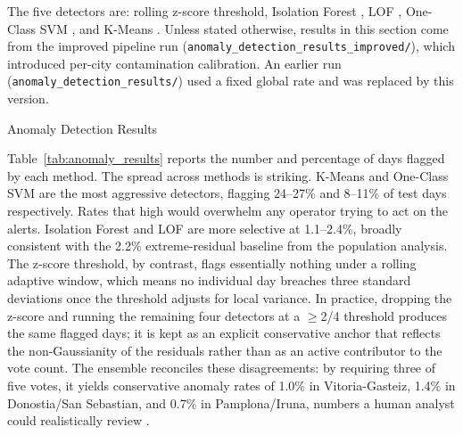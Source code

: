 ﻿\documentclass[12pt,reqno, twoside]{amsbook}
\makeatletter
\numberwithin{figure}{chapter}
\numberwithin{table}{chapter}
\numberwithin{equation}{chapter}
\def\subsection{\@startsection{subsection}{2}%
      \z@{.5\linespacing\@plus.7\linespacing}{.25\linespacing}%
      {\normalfont\bfseries\flushleft}}
\theoremstyle{plain}
\numberwithin{equation}{chapter}
\numberwithin{section}{chapter}
\makeatother
\begin{document}
The five detectors are: rolling z-score threshold, Isolation Forest \cite{liu_isolation_2008}, \ac{LOF} \cite{breunig_lof_2000}, One-Class \ac{SVM} \cite{scholkopf_estimating_2001}, and K-Means \cite{zangrando_anomaly_2022, m_z_h_unsupervised_2021}. Unless stated otherwise, results in this section come from the improved pipeline run (\texttt{anomaly\_detection\_results\_improved/}), which introduced per-city contamination calibration. An earlier run (\texttt{anomaly\_detection\_results/}) used a fixed global rate and was replaced by this version.

\subsection{Anomaly Detection Results}

Table~\ref{tab:anomaly_results} reports the number and percentage of days flagged by each method. The spread across methods is striking. K-Means and One-Class \ac{SVM} are the most aggressive detectors, flagging 24--27\% and 8--11\% of test days respectively. Rates that high would overwhelm any operator trying to act on the alerts. Isolation Forest and \ac{LOF} are more selective at 1.1--2.4\%, broadly consistent with the 2.2\% extreme-residual baseline from the population analysis. The z-score threshold, by contrast, flags essentially nothing under a rolling adaptive window, which means no individual day breaches three standard deviations once the threshold adjusts for local variance. In practice, dropping the z-score and running the remaining four detectors at a $\geq$2/4 threshold produces the same flagged days; it is kept as an explicit conservative anchor that reflects the non-Gaussianity of the residuals rather than as an active contributor to the vote count. The ensemble reconciles these disagreements: by requiring three of five votes, it yields conservative anomaly rates of 1.0\% in Vitoria-Gasteiz, 1.4\% in Donostia/San Sebastian, and 0.7\% in Pamplona/Iruna, numbers a human analyst could realistically review \cite{himeur_artificial_2021}.
\end{document}
